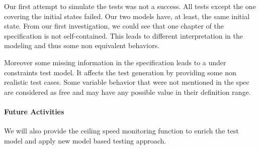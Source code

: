 Our first attempt to simulate the tests was not a success. All tests
except the one covering the initial states failed. Our two models
have, at least, the same initial state.
From  our first investigation, we could see that one chapter of
the specification is not self-contained. This leads to different
interpretation in the modeling and thus some non equivalent behaviors.

Moreover some missing information in the specification leads to a
under constraints test model. It affects the test generation by
providing some non realistic test cases. Some variable behavior that
were not mentioned in the spec are considered as free and may have any
possible value in their definition range.


\paragraph{Future Activities}
We will also provide the ceiling speed monitoring function to enrich
the test model and apply new model based testing approach.

%
%

